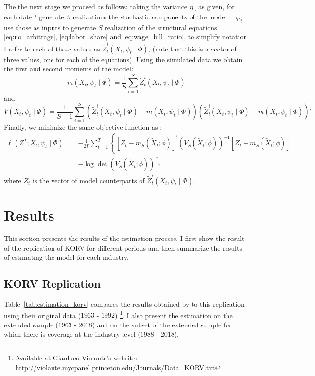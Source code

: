 \documentclass[12pt]{article}
\begin{document}
The the next stage we proceed as follows: taking the variance $\eta_\omega$ as given, for each date $t$ generate $S$ realizations the stochastic components of the model $\quad \varphi_t$ use those as inputs to generate $S$ realization of the structural equations \eqref{eq:no_arbitrage}, \eqref{eq:labor_share} and \eqref{eq:wage_bill_ratio}, to simplify notation I refer to each of those values as $\tilde{Z}^{i}_t(X_{t}, \psi_{t} \mid \Phi)$, (note that this is a vector of three values, one for each of the equations). Using the simulated data we obtain the first and second moments of the model: 
\begin{equation}\label{eq:first_moment}
 m(X_{t}, \psi_{t} \mid \Phi) = \frac{1}{S}\sum_{i=1}^S \tilde{Z}^{i}_t(X_{t}, \psi_{t} \mid \Phi)
\end{equation}
and
\begin{equation}\label{eq:second_moment}
 V(X_{t}, \psi_{t} \mid \Phi) = \frac{1}{S-1}\sum_{i=1}^S \left( \tilde{Z}^{i}_t(X_{t}, \psi_{t} \mid \Phi) - m(X_{t}, \psi_{t} \mid \Phi) \right) \left( \tilde{Z}^{i}_t(X_{t}, \psi_{t} \mid \Phi) - m(X_{t}, \psi_{t} \mid \Phi) \right)'
\end{equation}
Finally, we minimize the same objective function as \citep{krusell2000capital}:
\begin{equation}\label{eq:objective_funct_estimation}
 \begin{aligned}
 \ell\left(Z^{T} ; X_{t}, \psi_{t} \mid \Phi\right)=&-\frac{1}{2 T} \sum_{t=1}^{T}\left\{\left[Z_{t}-m_{S}\left(\tilde{X}_{t} ; \phi\right)\right]^{\prime}\left(V_{S}\left(\tilde{X}_{t} ; \phi\right)\right)^{-1}\left[Z_{t}-m_{S}\left(\tilde{X}_{t} ; \phi\right)\right]\right.\\
 &\left.-\log \operatorname{det}\left(V_{S}\left(\tilde{X}_{t} ; \phi\right)\right)\right\}
 \end{aligned} 
\end{equation}
where $Z_{t}$ is the vector of model counterparts of $\tilde{Z}^{i}_t(X_{t}, \psi_{t} \mid \Phi)$.
\section{Results}\label{sec:results}
This section presents the results of the estimation process. I first show the result of the replication of KORV for different periods and then summarize the results of estimating the model for each industry.
\subsection{KORV Replication}\label{sec:results_original}
Table~\ref{tab:estimation_korv} compares the results obtained by \citet{krusell2000capital} to this replication using their 
original data ($1963$ - $1992$) \footnote{Available at Gianluca Violante's website: \url{http://violante.mycpanel.princeton.edu/Journals/Data_KORV.txt}}. I also present the estimation on the extended sample ($1963$ - $2018$) and on the subset of the extended sample for which there is coverage at the industry level ($1988$ - $2018$). 
\end{document}
